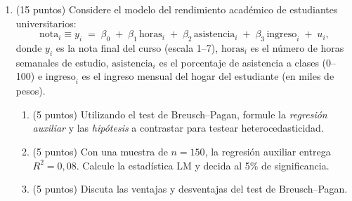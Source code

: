 \documentclass[10pt,a4paper]{article}
\begin{document}
\begin{enumerate}
 
\noindent\textbf{Cálculo del intercepto:}
\[
\hat\beta_0^{IV} \;=\; \bar y \;-\; \hat\beta_1^{IV}\,\bar{\hat{x}} \;=\; 13 \;-\; 0{,}64 \times 8 \;=\; 13 - 5{,}12 \;=\; 7{,}88.
\]

\noindent\textbf{Modelo estimado por MC2E:}
\[
\widehat{\text{Productividad}}_i \;=\; 7{,}88 \;+\; 0{,}64 \cdot \text{Capacitación}_i.
\]
 
\vspace{0.5cm}

\noindent\textbf{(c) Interpretación.}

El estimador $\hat\beta_1^{IV} \approx 0{,}2687$ indica que, en promedio, una \textbf{hora adicional de capacitación} aumenta la productividad del trabajador en aproximadamente \textbf{0{,}27 unidades de output por hora}, una vez aislado el efecto causal mediante el instrumento.

A diferencia del estimador por MCO, que estaría sesgado por la presencia de factores no observados (como motivación o habilidad) correlacionados con la decisión de capacitarse, el estimador MC2E utiliza únicamente la variación en horas de capacitación \textbf{inducida por la distancia al centro} (la parte exógena), lo que permite obtener una estimación consistente del efecto causal.


      \color{black}  
\item (15 puntos) Considere el modelo del rendimiento académico de estudiantes universitarios:
\[
\text{nota}_i \equiv y_i \;=\; \beta_0 \;+\; \beta_1\,\text{horas}_i \;+\; \beta_2\,\text{asistencia}_i \;+\; \beta_3\,\text{ingreso}_i \;+\; u_i,
\]
donde $y_i$ es la nota final del curso (escala 1--7), $\text{horas}_i$ es el número de horas semanales de estudio, $\text{asistencia}_i$ es el porcentaje de asistencia a clases (0--100) e $\text{ingreso}_i$ es el ingreso mensual del hogar del estudiante (en miles de pesos).
 
\begin{enumerate}
\item (5 puntos) Utilizando el test de Breusch--Pagan, formule la \emph{regresión auxiliar} y las \emph{hipótesis} a contrastar para testear heterocedasticidad.
 
\item (5 puntos) Con una muestra de $n = 150$, la regresión auxiliar entrega $R^2 = 0{,}08$. Calcule la estadística LM y decida al 5\% de significancia.
 
\item (5 puntos) Discuta las ventajas y desventajas del test de Breusch--Pagan.
\end{enumerate}
 

\end{enumerate}
\end{document}
